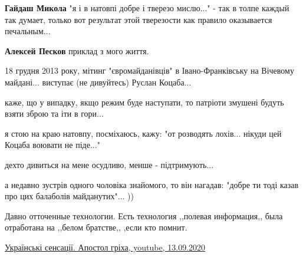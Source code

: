 \begin{itemize}
\begin{itemize}
 
\textbf{Гайдаш Микола} "я і в натовпі добре і тверезо мислю..." - так в толпе
каждый так думает, только вот результат этой тверезости как правило оказывается
печальным...

 
\textbf{Алексей Песков} приклад з мого життя.

18 грудня 2013 року, мітинг "євромайданівців" в Івано-Франківську на Вічевому
майдані... виступає (не дивуйтесь) Руслан Коцаба...

каже, що у випадку, якщо режим буде наступати, то патріоти змушені будуть взяти
зброю та іти в гори...

я стою на краю натовпу, посміхаюсь, кажу: "от розводять лохів... нікуди цей
Коцаба воювати не піде..."

дехто дивиться на мене осудливо, менше - підтримують...

а недавно зустрів одного чоловіка знайомого, то він нагадав: "добре ти тоді
казав про цих балаболів майданутих"... ))
\end{itemize}

 
Давно отточенные технологии. Есть технология ,,полевая информация,, была
отработана на ,,белом братстве,, ,если кто помнит.

\begin{itemize}
 

\href{https://www.youtube.com/watch?v=3NcfBMeonB0&t=237s}{%
Українські сенсації. Апостол гріха, youtube, 13.09.2020%
%
}


\end{itemize}
\end{itemize}
